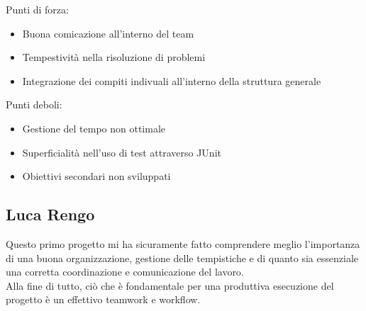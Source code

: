 \begin{flushleft}
	
	\textsf{\small Punti di forza: }\\
	
	\begin{itemize}
		\item \textsf{\small Buona comicazione all'interno del team} 
		\item \textsf{\small Tempestività nella risoluzione di problemi}
		\item \textsf{\small Integrazione dei compiti indivuali all'interno della struttura generale}
	\end{itemize}
	
	\textsf{\small Punti deboli: }\\
	
	\begin{itemize}
		\item \textsf{\small Gestione del tempo non ottimale}
		\item \textsf{\small Superficialità nell'uso di test attraverso JUnit}
		\item \textsf{\small Obiettivi secondari non sviluppati}
	\end{itemize}
	
\end{flushleft}


\subsection*{Luca Rengo}

\textsf{\small Questo primo progetto mi ha sicuramente fatto comprendere meglio l'importanza di una buona organizzazione, gestione delle tempistiche e di quanto sia essenziale una corretta coordinazione e comunicazione del lavoro.}\\
\textsf{\small Alla fine di tutto, ciò che è fondamentale per una produttiva esecuzione del progetto è un effettivo teamwork e workflow. } %

